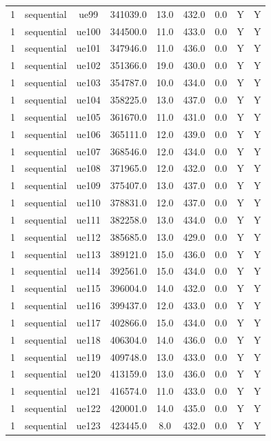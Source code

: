 \begin{table}[ht]
\begin{tabular}{|c|c|c|c|c|c|c|c|c|}
1 & sequential & ue99 & 341039.0 & 13.0 & 432.0 & 0.0 & Y & Y \\
1 & sequential & ue100 & 344500.0 & 11.0 & 433.0 & 0.0 & Y & Y \\
1 & sequential & ue101 & 347946.0 & 11.0 & 436.0 & 0.0 & Y & Y \\
1 & sequential & ue102 & 351366.0 & 19.0 & 430.0 & 0.0 & Y & Y \\
1 & sequential & ue103 & 354787.0 & 10.0 & 434.0 & 0.0 & Y & Y \\
1 & sequential & ue104 & 358225.0 & 13.0 & 437.0 & 0.0 & Y & Y \\
1 & sequential & ue105 & 361670.0 & 11.0 & 431.0 & 0.0 & Y & Y \\
1 & sequential & ue106 & 365111.0 & 12.0 & 439.0 & 0.0 & Y & Y \\
1 & sequential & ue107 & 368546.0 & 12.0 & 434.0 & 0.0 & Y & Y \\
1 & sequential & ue108 & 371965.0 & 12.0 & 432.0 & 0.0 & Y & Y \\
1 & sequential & ue109 & 375407.0 & 13.0 & 437.0 & 0.0 & Y & Y \\
1 & sequential & ue110 & 378831.0 & 12.0 & 437.0 & 0.0 & Y & Y \\
1 & sequential & ue111 & 382258.0 & 13.0 & 434.0 & 0.0 & Y & Y \\
1 & sequential & ue112 & 385685.0 & 13.0 & 429.0 & 0.0 & Y & Y \\
1 & sequential & ue113 & 389121.0 & 15.0 & 436.0 & 0.0 & Y & Y \\
1 & sequential & ue114 & 392561.0 & 15.0 & 434.0 & 0.0 & Y & Y \\
1 & sequential & ue115 & 396004.0 & 14.0 & 432.0 & 0.0 & Y & Y \\
1 & sequential & ue116 & 399437.0 & 12.0 & 433.0 & 0.0 & Y & Y \\
1 & sequential & ue117 & 402866.0 & 15.0 & 434.0 & 0.0 & Y & Y \\
1 & sequential & ue118 & 406304.0 & 14.0 & 436.0 & 0.0 & Y & Y \\
1 & sequential & ue119 & 409748.0 & 13.0 & 433.0 & 0.0 & Y & Y \\
1 & sequential & ue120 & 413159.0 & 13.0 & 436.0 & 0.0 & Y & Y \\
1 & sequential & ue121 & 416574.0 & 11.0 & 433.0 & 0.0 & Y & Y \\
1 & sequential & ue122 & 420001.0 & 14.0 & 435.0 & 0.0 & Y & Y \\
1 & sequential & ue123 & 423445.0 & 8.0 & 432.0 & 0.0 & Y & Y \\

\end{tabular}
\end{table}
